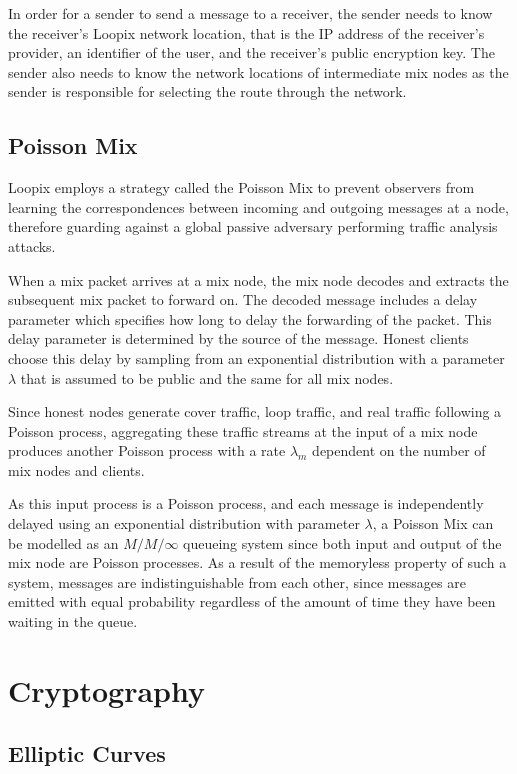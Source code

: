 \documentclass[12pt,a4paper,twoside,openright]{report}
\begin{document}
In order for a sender to send a message to a receiver, the sender needs to know the receiver's Loopix network location, that is the IP address of the receiver's provider, an identifier of the user, and the receiver's public encryption key. The sender also needs to know the network locations of intermediate mix nodes as the sender is responsible for selecting the route through the network.


\subsection{Poisson Mix}

Loopix employs a strategy called the Poisson Mix to prevent observers from learning the correspondences between incoming and outgoing messages at a node, therefore guarding against a global passive adversary performing traffic analysis attacks. 

When a mix packet arrives at a mix node, the mix node decodes and extracts the subsequent mix packet to forward on. The decoded message includes a delay parameter which specifies how long to delay the forwarding of the packet. This delay parameter is determined by the source of the message. Honest clients choose this delay by sampling from an exponential distribution with a parameter $\lambda$ that is assumed to be public and the same for all mix nodes.

Since honest nodes generate cover traffic, loop traffic, and real traffic following a Poisson process, aggregating these traffic streams at the input of a mix node produces another Poisson process with a rate $\lambda_m$ dependent on the number of mix nodes and clients.

As this input process is a Poisson process, and each message is independently delayed using an exponential distribution with parameter $\lambda$, a Poisson Mix can be modelled as an $M/M/\infty$ queueing system since both input and output of the mix node are Poisson processes. As a result of the memoryless property of such a system, messages are indistinguishable from each other, since messages are emitted with equal probability regardless of the amount of time they have been waiting in the queue.

\section{Cryptography}

\subsection{Elliptic Curves}
\end{document}
